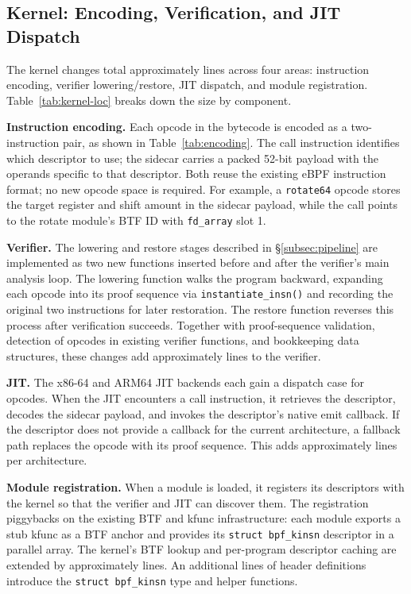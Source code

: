 \subsection{Kernel: Encoding, Verification, and JIT Dispatch}
\label{subsec:kernel}

The kernel changes total approximately  lines across four areas: instruction encoding, verifier lowering/restore, JIT dispatch, and module registration. Table~\ref{tab:kernel-loc} breaks down the size by component.



\noindent\textbf{Instruction encoding.}
Each \lang opcode in the bytecode is encoded as a two-instruction pair, as shown in Table~\ref{tab:encoding}. The call instruction identifies which \lang descriptor to use; the sidecar carries a packed 52-bit payload with the operands specific to that descriptor. Both reuse the existing eBPF instruction format; no new opcode space is required. For example, a \texttt{rotate64} opcode stores the target register and shift amount in the sidecar payload, while the call points to the rotate module's BTF ID with \texttt{fd\_array} slot 1.



\noindent\textbf{Verifier.}
The lowering and restore stages described in \S\ref{subsec:pipeline} are implemented as two new functions inserted before and after the verifier's main analysis loop. The lowering function walks the program backward, expanding each \lang opcode into its proof sequence via \texttt{instantiate\_insn()} and recording the original two instructions for later restoration. The restore function reverses this process after verification succeeds. Together with proof-sequence validation, detection of \lang opcodes in existing verifier functions, and bookkeeping data structures, these changes add approximately  lines to the verifier.

\noindent\textbf{JIT.}
The x86-64 and ARM64 JIT backends each gain a dispatch case for \lang opcodes. When the JIT encounters a \lang call instruction, it retrieves the descriptor, decodes the sidecar payload, and invokes the descriptor's native emit callback. If the descriptor does not provide a callback for the current architecture, a fallback path replaces the \lang opcode with its proof sequence. This adds approximately  lines per architecture.

\noindent\textbf{Module registration.}
When a \lang module is loaded, it registers its descriptors with the kernel so that the verifier and JIT can discover them. The registration piggybacks on the existing BTF and kfunc infrastructure: each module exports a stub kfunc as a BTF anchor and provides its \texttt{struct bpf\_kinsn} descriptor in a parallel array. The kernel's BTF lookup and per-program descriptor caching are extended by approximately  lines. An additional  lines of header definitions introduce the \texttt{struct bpf\_kinsn} type and helper functions.

